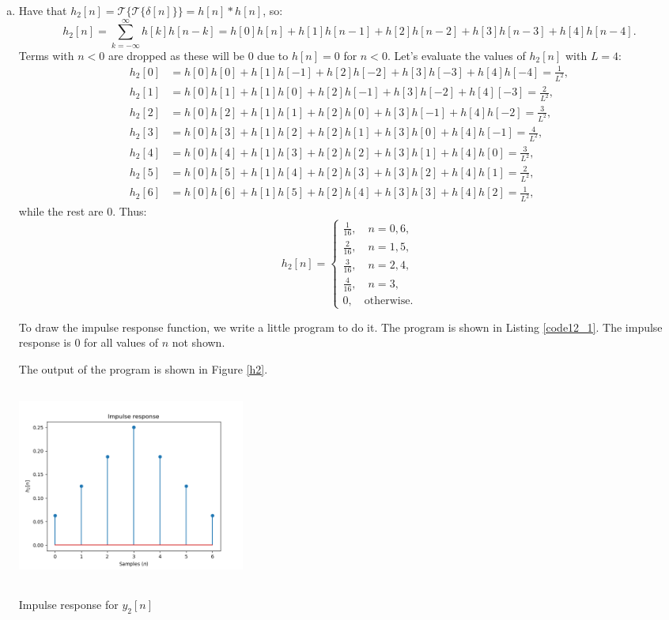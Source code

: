 \begin{enumerate}
\begin{enumerate}[a)]
\item Have that $h_{2}[n]=\mathcal{T}\{\mathcal{T}\{\delta[n]\}\}=h[n]*h[n]$, so:
$$h_{2}[n]=\sum_{k=-\infty}^{\infty} h[k]h[n-k]=h[0]h[n]+h[1]h[n-1]+h[2]h[n-2]+h[3]h[n-3]+h[4]h[n-4].$$
Terms with $n<0$ are dropped as these will be $0$ due to $h[n]=0$ for $n<0$. Let's evaluate the values of $h_{2}[n]$ with $L=4$:
\begin{align*}
    h_{2}[0]&=h[0]h[0]+h[1]h[-1]+h[2]h[-2]+h[3]h[-3]+h[4]h[-4] = \frac{1}{L^{2}}, \\
    h_{2}[1]&=h[0]h[1]+h[1]h[0]+h[2]h[-1]+h[3]h[-2]+h[4][-3] =\frac{2}{L^{2}}, \\
    h_{2}[2]&=h[0]h[2]+h[1]h[1]+h[2]h[0]+h[3]h[-1]+h[4]h[-2] = \frac{3}{L^{2}}, \\
    h_{2}[3]&=h[0]h[3]+h[1]h[2]+h[2]h[1]+h[3]h[0]+h[4]h[-1] = \frac{4}{L^{2}}, \\
    h_{2}[4]&=h[0]h[4]+h[1]h[3]+h[2]h[2]+h[3]h[1]+h[4]h[0] = \frac{3}{L^{2}}, \\
    h_{2}[5]&=h[0]h[5]+h[1]h[4]+h[2]h[3]+h[3]h[2]+h[4]h[1] = \frac{2}{L^{2}}, \\
    h_{2}[6]&=h[0]h[6]+h[1]h[5]+h[2]h[4]+h[3]h[3]+h[4]h[2] = \frac{1}{L^{2}},
\end{align*}
while the rest are $0$. Thus:
$$h_{2}[n]=\begin{cases}
    \frac{1}{16}, \quad n=0,6,\\
    \frac{2}{16}, \quad n=1,5,\\
    \frac{3}{16}, \quad n=2,4,\\
    \frac{4}{16}, \quad n=3,\\
    0, \quad \text{otherwise}.
\end{cases}$$

To draw the impulse response function, we write a little program to do it. 
The program is shown in Listing \ref{code12_1}. The impulse response is $0$ for all values of $n$ not shown. 

The output of the program is shown in Figure \ref{h2}.

\begin{marginfigure}
    \includegraphics[width=7.5cm,height=6.5cm]{ch10/figures/h2.png}
    \caption{Impulse response for $y_{2}[n]$}
    \label{h2}
\end{marginfigure}
\end{enumerate}


\end{enumerate}
